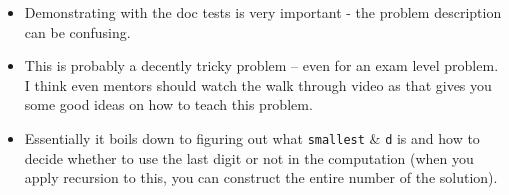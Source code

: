     \begin{blocksection}
    \begin{guide}
    \begin{itemize}
      \item Demonstrating with the doc tests is very important - the problem description can be confusing.
      \item This is probably a decently tricky problem -- even for an exam level problem. I think even mentors should watch the walk through video as that gives you some good ideas on how to teach this problem. \item Essentially it boils down to figuring out what \lstinline{smallest} \& \lstinline{d} is and how to decide whether to use the last digit or not in the computation (when you apply recursion to this, you can construct the entire number of the solution).
    \end{itemize}
    \end{guide}
    \end{blocksection}
    